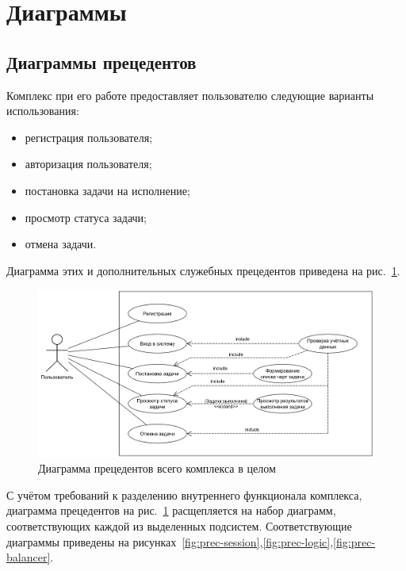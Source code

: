 \documentclass[a4paper,12pt]{report}
\date{\today}
\numberwithin{equation}{section}
\begin{document}
\setcounter{page}{12}
\setcounter{section}{1}
\section{Диаграммы}
\subsection{Диаграммы прецедентов}
Комплекс при его работе предоставляет пользователю следующие варианты использования:
\begin{itemize}
  \item регистрация пользователя;
  \item авторизация пользователя;
  \item постановка задачи на исполнение;
  \item просмотр статуса задачи;
  \item отмена задачи.
\end{itemize}

Диаграмма этих и дополнительных служебных прецедентов приведена на рис.~\ref{fig:prec-common}.

\begin{figure}[b]
  \centering
  \includegraphics[width=.9\linewidth]{../diagrams/common/usecase}
  \caption{Диаграмма прецедентов всего комплекса в целом}
  \label{fig:prec-common}
\end{figure}

С учётом требований к разделению внутреннего функционала комплекса, диаграмма прецедентов на рис.~\ref{fig:prec-common}
расщепляется на набор диаграмм, соответствующих каждой из выделенных подсистем.
Соответствующие диаграммы приведены на рисунках~\ref{fig:prec-session},\ref{fig:prec-logic},\ref{fig:prec-balancer}.
\end{document}
